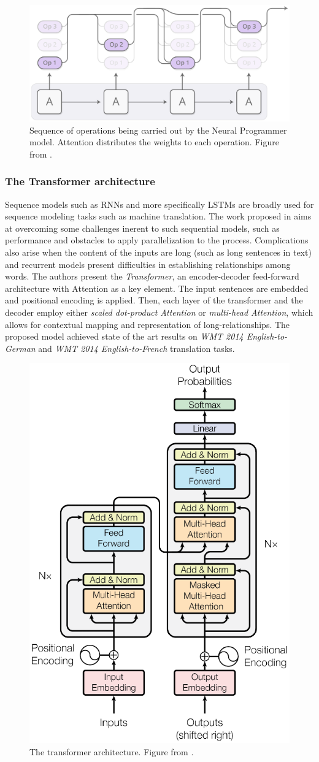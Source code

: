 \documentclass[12pt]{article}
\begin{document}
\begin{figure}
\begin{center}
    \includegraphics[width=0.5\linewidth]{./img/neural-programmer.png}
\caption{
    Sequence of operations being carried out by the Neural Programmer model.
    Attention distributes the weights to each operation.
    Figure from \cite{ref:distill}.
}
\label{fig:np}
\end{center}
\end{figure}

\subsubsection{The Transformer architecture}
Sequence models such as RNNs and more specifically LSTMs are broadly used for sequence modeling tasks such
as machine translation.
The work proposed in \cite{ref:transformer} aims at overcoming some challenges inerent to such sequential
models, such as performance and obstacles to apply parallelization to the process.
Complications also arise when the content of the inputs are long (such as long sentences in text) and
recurrent models present difficulties in establishing relationships among words.
The authors present the \emph{Transformer}, an encoder-decoder feed-forward architecture with
Attention as a key element.
The input sentences are embedded and positional encoding is applied.
Then, each layer of the transformer and the decoder employ either \emph{scaled dot-product Attention} or
\emph{multi-head Attention}, which allows for contextual mapping and representation of long-relationships.
The proposed model achieved state of the art results on \emph{WMT 2014 English-to-German} and
\emph{WMT 2014 English-to-French} translation tasks.

\begin{figure}
\begin{center}
    \includegraphics[width=0.4\linewidth]{./img/transformer.png}
\caption{
    The transformer architecture.
    Figure from \cite{ref:transformer}.
}
\label{fig:transformer}
\end{center}
\end{figure}
\end{document}
